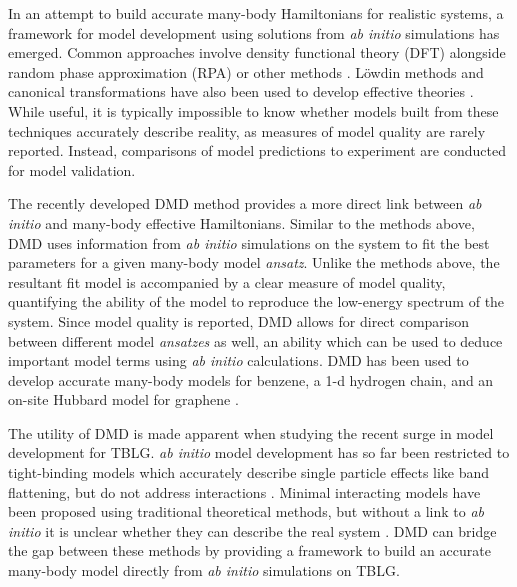 \documentclass[12pt]{article}
\begin{document}
In an attempt to build accurate many-body Hamiltonians for realistic systems, a framework for model development using solutions from \textit{ab initio} simulations has emerged.
Common approaches involve density functional theory (DFT) \cite{PhysRev.140.A1133, PhysRevLett.87.047003} alongside random phase approximation (RPA) or other methods \cite{PhysRevB.62.R16219, PhysRevB.70.195104, PhysRevB.88.075106}.
L\"owdin methods and canonical transformations have also been used to develop effective theories \cite{doi:10.1063/1.4802766, PhysRevA.81.013402, doi:10.1063/1.2196410}.
While useful, it is typically impossible to know whether models built from these techniques accurately describe reality, as measures of model quality are rarely reported.
Instead, comparisons of model predictions to experiment are conducted for model validation.

The recently developed DMD \cite{Zheng2017} method provides a more direct link between \textit{ab initio} and many-body effective Hamiltonians.
Similar to the methods above, DMD uses information from \textit{ab initio} simulations on the system to fit the best parameters for a given many-body model \textit{ansatz}.
Unlike the methods above, the resultant fit model is accompanied by a clear measure of model quality, quantifying the ability of the model to reproduce the low-energy spectrum of the system.
Since model quality is reported, DMD allows for direct comparison between different model \textit{ansatzes} as well, an ability which can be used to deduce important model terms using \textit{ab initio} calculations.
DMD has been used to develop accurate many-body models for benzene, a 1-d hydrogen chain, and an on-site Hubbard model for graphene \cite{Zheng2017, Wagner2015}.

The utility of DMD is made apparent when studying the recent surge in model development for TBLG.
\textit{ab initio} model development has so far been restricted to tight-binding models which accurately describe single particle effects like band flattening, but do not address interactions \cite{Fang, Fang2016, PhysRevX.8.031088, PhysRevX.8.031087}.
Minimal interacting models have been proposed using traditional theoretical methods, but without a link to \textit{ab initio} it is unclear whether they can describe the real system \cite{PhysRevB.98.045103, PhysRevB.100.125116, PhysRevX.8.031089}.
DMD can bridge the gap between these methods by providing a framework to build an accurate many-body model directly from \textit{ab initio} simulations on TBLG.
\end{document}

